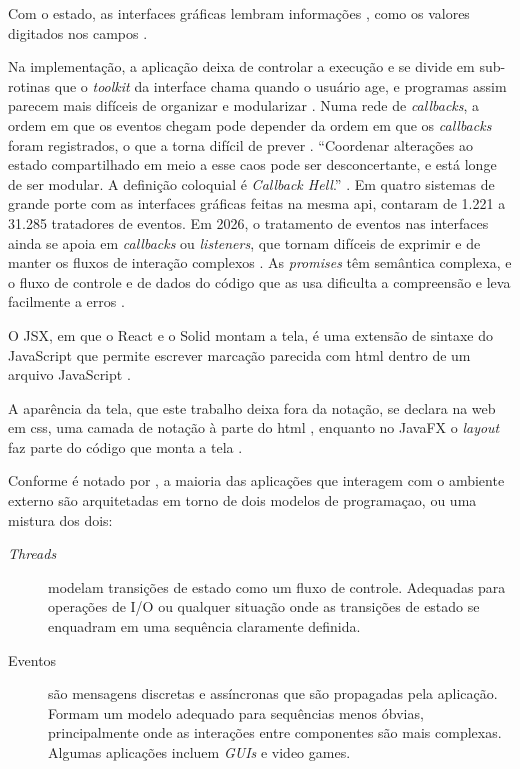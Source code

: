 Com o estado, as interfaces gráficas lembram informações
\cite[p. 14]{vanroy2009}, como os valores digitados nos campos
\cite[p. 12:3]{madsen2020}.

Na implementação, a aplicação deixa de controlar a execução e se divide em
sub-rotinas que o \emph{toolkit} da interface chama quando o usuário age, e
programas assim parecem mais difíceis de organizar e modularizar
\cite[p. 79]{myers1994}.
Numa rede de \emph{callbacks}, a ordem em que os eventos chegam pode depender da
ordem em que os \emph{callbacks} foram registrados, o que a torna difícil de prever
\cite[p. 8]{blackheath2016}.
“Coordenar alterações ao estado compartilhado em meio a esse caos pode ser
desconcertante, e está longe de ser modular. A definição coloquial é \emph{Callback
Hell}.” \cite[p. 926; tradução nossa]{edwards2009}.
Em quatro sistemas de grande porte com as interfaces gráficas feitas na
mesma \gls{api}, \textcite[p. 770]{mijailovic2014} contaram de 1.221 a 31.285
tratadores de eventos.
Em 2026, o tratamento de eventos nas interfaces ainda se apoia em
\emph{callbacks} ou \emph{listeners}, que tornam difíceis de exprimir e de manter os
fluxos de interação complexos \cite[p. 8]{grolaux2026}.
As \emph{promises} têm semântica complexa, e o fluxo de controle e de dados do
código que as usa dificulta a compreensão e leva facilmente a erros
\cite[p. 162:1]{alimadadi2018}.

O JSX, em que o React e o Solid montam a tela, é uma extensão de sintaxe do
JavaScript que permite escrever marcação parecida com \gls{html} dentro de
um arquivo JavaScript \cite{meta2026c}.

A aparência da tela, que este trabalho deixa fora da notação, se declara
na web em \gls{css}, uma camada de notação à parte do \gls{html}
\cite[p. 342]{green2006}, enquanto no JavaFX o \emph{layout} faz parte do
código que monta a tela \cite[p. 17]{kiss2014}.

Conforme é notado por \textcite{blackheath2016}, a maioria das aplicações que
interagem com o ambiente externo são arquitetadas em torno de dois modelos de
programaçao, ou uma mistura dos dois:

\begin{description}
\item[{\emph{Threads}}] modelam transições de estado como um fluxo de controle.
Adequadas para operações de I/O ou qualquer situação onde as
transições de estado se enquadram em uma sequência claramente
definida.
\item[{Eventos}] são mensagens discretas e assíncronas que são propagadas pela
aplicação. Formam um modelo adequado para sequências menos
óbvias, principalmente onde as interações entre componentes são
mais complexas. Algumas aplicações incluem \emph{GUIs} e video
games.
\end{description}

